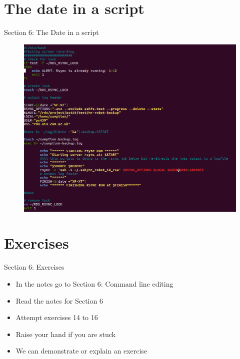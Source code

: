 \section{The date in a script}
\begin{frame}{Section 6: The Date in a script}
\begin{figure}[h]
\includegraphics[height=0.8\textheight]{imgs/script-date.png}
\end{figure}
\end{frame}

\section{Exercises}
\begin{frame}{Section 6: Exercises}
\begin{itemize}
\item In the notes go to {Section 6: Command line editing}
\item Read the notes for Section 6 
\item Attempt exercises 14 to 16
\item Raise your hand if you are stuck
\item We can demonstrate or explain an exercise
\end{itemize}
\end{frame}

